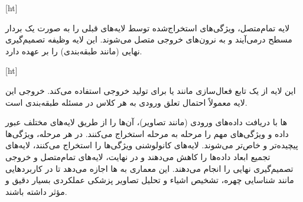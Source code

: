 [ht]



لایه تمام‌متصل، ویژگی‌های استخراج‌شده توسط لایه‌های قبلی را به صورت یک بردار مسطح درمی‌آیند و به نرون‌های خروجی متصل می‌شوند. این لایه وظیفه تصمیم‌گیری نهایی (مانند طبقه‌بندی) را بر عهده دارد.

[ht]



این لایه از یک تابع فعال‌سازی مانند  یا  برای تولید خروجی استفاده می‌کند. خروجی این لایه معمولاً احتمال تعلق ورودی به هر کلاس در مسئله طبقه‌بندی است.





ها
با دریافت داده‌های ورودی (مانند تصاویر)، آن‌ها را از طریق لایه‌های مختلف عبور داده و ویژگی‌های مهم را مرحله به مرحله استخراج می‌کنند. در هر مرحله، ویژگی‌ها پیچیده‌تر و خاص‌تر می‌شوند. لایه‌های کانولوشنی ویژگی‌ها را استخراج می‌کنند، لایه‌های تجمیع ابعاد داده‌ها را کاهش می‌دهند و در نهایت، لایه‌های تمام‌متصل و خروجی تصمیم‌گیری نهایی را انجام می‌دهند. این معماری به ‌ها اجازه می‌دهد تا در کاربردهایی مانند شناسایی چهره، تشخیص اشیاء و تحلیل تصاویر پزشکی عملکردی بسیار دقیق و مؤثر داشته باشند.










